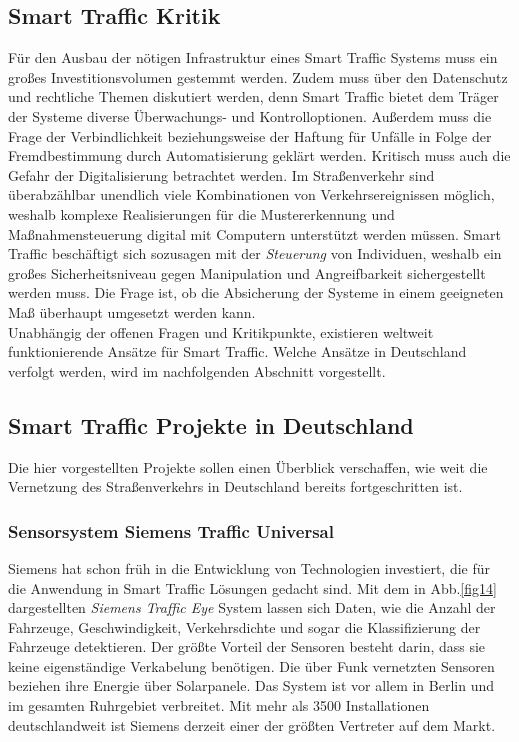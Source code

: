 \subsection{Smart Traffic Kritik}

Für den Ausbau der nötigen Infrastruktur eines Smart Traffic Systems muss ein großes Investitionsvolumen gestemmt werden. Zudem muss über den Datenschutz und rechtliche Themen diskutiert werden, denn Smart Traffic bietet dem Träger der Systeme diverse Überwachungs- und Kontrolloptionen. Außerdem muss die Frage der Verbindlichkeit beziehungsweise der Haftung für Unfälle in Folge der Fremdbestimmung durch Automatisierung geklärt werden. Kritisch muss auch die Gefahr der Digitalisierung betrachtet werden. Im Straßenverkehr sind überabzählbar unendlich viele Kombinationen von Verkehrsereignissen möglich, weshalb komplexe Realisierungen für die Mustererkennung und Maßnahmensteuerung digital mit Computern unterstützt werden müssen. Smart Traffic beschäftigt sich sozusagen mit der \emph{Steuerung} von Individuen, weshalb ein großes Sicherheitsniveau gegen Manipulation und Angreifbarkeit sichergestellt werden muss. Die Frage ist, ob die Absicherung der Systeme in einem geeigneten Maß überhaupt umgesetzt werden kann.\\
Unabhängig der offenen Fragen und Kritikpunkte, existieren weltweit funktionierende Ansätze für Smart Traffic. Welche Ansätze in Deutschland verfolgt werden, wird im nachfolgenden Abschnitt vorgestellt.

\subsection{Smart Traffic Projekte in Deutschland}\label{smartTrafficGermany}
Die hier vorgestellten Projekte sollen einen Überblick verschaffen, wie weit die Vernetzung des Straßenverkehrs in Deutschland bereits fortgeschritten ist.


\subsubsection{Sensorsystem Siemens Traffic Universal}
Siemens hat schon früh in die Entwicklung von Technologien investiert, die für die Anwendung in Smart Traffic Lösungen gedacht sind. Mit dem in Abb.\ref{fig14} dargestellten \textit{Siemens Traffic Eye} System lassen sich Daten, wie die Anzahl der Fahrzeuge, Geschwindigkeit, Verkehrsdichte und sogar die Klassifizierung der Fahrzeuge detektieren. Der größte Vorteil der Sensoren besteht darin, dass sie keine eigenständige Verkabelung benötigen. Die über Funk vernetzten Sensoren beziehen ihre Energie über Solarpanele. Das System ist vor allem in Berlin und im gesamten Ruhrgebiet verbreitet. Mit mehr als 3500 Installationen deutschlandweit ist Siemens derzeit einer der größten Vertreter auf dem Markt.

